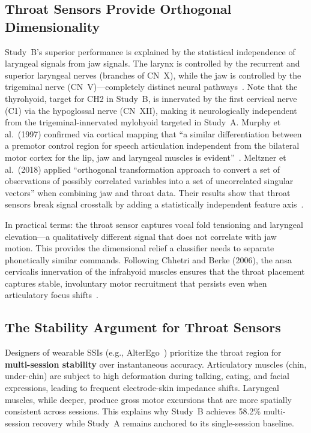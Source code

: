 \documentclass[11pt, a4paper]{article}
\begin{document}
\subsection{Throat Sensors Provide Orthogonal Dimensionality}

Study~B's superior performance is explained by the statistical independence of laryngeal signals from jaw signals. The larynx is controlled by the recurrent and superior laryngeal nerves (branches of CN~X), while the jaw is controlled by the trigeminal nerve (CN~V)---completely distinct neural pathways~\cite{ala2018}. Note that the thyrohyoid, target for CH2 in Study~B, is innervated by the first cervical nerve (C1) via the hypoglossal nerve (CN~XII), making it neurologically independent from the trigeminal-innervated mylohyoid targeted in Study~A. Murphy et al.\ (1997) confirmed via cortical mapping that ``a similar differentiation between a premotor control region for speech articulation independent from the bilateral motor cortex for the lip, jaw and laryngeal muscles is evident''~\cite{murphy1997}. Meltzner et al.\ (2018) applied ``orthogonal transformation approach to convert a set of observations of possibly correlated variables into a set of uncorrelated singular vectors'' when combining jaw and throat data. Their results show that throat sensors break signal crosstalk by adding a statistically independent feature axis~\cite{meltzner2018}.

In practical terms: the throat sensor captures vocal fold tensioning and laryngeal elevation---a qualitatively different signal that does not correlate with jaw motion. This provides the dimensional relief a classifier needs to separate phonetically similar commands. Following Chhetri and Berke (2006), the ansa cervicalis innervation of the infrahyoid muscles ensures that the throat placement captures stable, involuntary motor recruitment that persists even when articulatory focus shifts~\cite{chhetri2006}.

\subsection{The Stability Argument for Throat Sensors}

Designers of wearable SSIs (e.g., AlterEgo~\cite{kapur2018}) prioritize the throat region for \textbf{multi-session stability} over instantaneous accuracy. Articulatory muscles (chin, under-chin) are subject to high deformation during talking, eating, and facial expressions, leading to frequent electrode-skin impedance shifts. Laryngeal muscles, while deeper, produce gross motor excursions that are more spatially consistent across sessions. This explains why Study~B achieves 58.2\% multi-session recovery while Study~A remains anchored to its single-session baseline.
\end{document}
